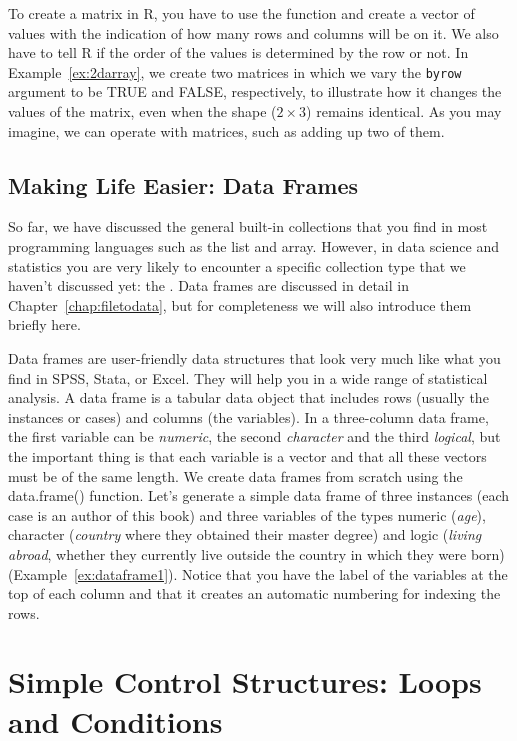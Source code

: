 To create a matrix in R, you have to use the function  and
create a vector of values with the indication of how many rows and
columns will be on it. We also have to tell R if the order of the
values is determined by the row or not. In Example~\ref{ex:2darray}, we create
two matrices in which we vary the \verb|byrow| argument to be TRUE and
FALSE, respectively, to illustrate how it changes the values of the
matrix, even when the shape ($2 \times3$) remains identical. As you may
imagine, we can operate with matrices, such as adding up two of them.


\subsection{Making Life Easier: Data Frames}\label{sec:dataframes}

So far, we have discussed the general built-in collections that you find in most programming languages
such as the list and array.
However, in data science and statistics you are very likely to encounter a specific collection type that we haven't discussed yet: the .
Data frames are discussed in detail in Chapter~\ref{chap:filetodata},
but for completeness we will also introduce them briefly here. 

Data frames are user-friendly data structures that look very much like
what you find in SPSS, Stata, or Excel. They will help you in a wide
range of statistical analysis.  A
data frame is a tabular data object that includes rows (usually the
instances or cases) and columns (the variables). In a three-column data frame,
the first variable can be \emph{numeric}, the second \emph{character}
and the third \emph{logical}, but the important thing is that each
variable is a vector and that all these vectors must be of the same
length. We create data frames from scratch using the data.frame()
function.  Let’s generate a simple data frame of three instances (each
case is an author of this book) and three variables of the types
numeric (\emph{age}), character (\emph{country} where they obtained their
master degree) and logic (\emph{living abroad}, whether they currently
live outside the country in which they were born) (Example~\ref{ex:dataframe1}).
Notice that you have the label of the variables at the top of each column and that it creates an automatic numbering for indexing the rows.  


\section{Simple Control Structures: Loops and Conditions}	
\label{sec:controlstructures}

